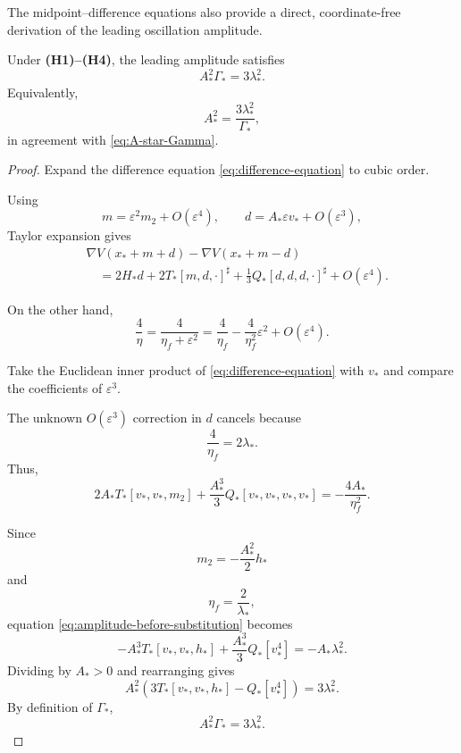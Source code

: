 The midpoint--difference equations also provide a direct,
coordinate-free derivation of the leading oscillation amplitude.

\begin{proposition}
\label{prop:amplitude-identity}
Under \textbf{(H1)--(H4)}, the leading amplitude satisfies
\begin{equation}
A_*^2\Gamma_*
=
3\lambda_*^2.
\label{eq:amplitude-Gamma-identity}
\end{equation}
Equivalently,
\begin{equation}
A_*^2
=
\frac{3\lambda_*^2}{\Gamma_*},
\label{eq:amplitude-coordinate-free}
\end{equation}
in agreement with
\eqref{eq:A-star-Gamma}.
\end{proposition}

\begin{proof}
Expand the difference equation
\eqref{eq:difference-equation} to cubic order.

Using
\[
m
=
\varepsilon^2m_2+O(\varepsilon^4),
\qquad
d
=
A_*\varepsilon v_*+O(\varepsilon^3),
\]
Taylor expansion gives
\begin{align}
&
\nabla V(x_*+m+d)
-
\nabla V(x_*+m-d)
\nonumber\\
&\quad=
2H_*d
+
2T_*[m,d,\cdot]^\sharp
+
\frac13Q_*[d,d,d,\cdot]^\sharp
+
O(\varepsilon^4).
\label{eq:difference-expanded}
\end{align}

On the other hand,
\[
\frac{4}{\eta}
=
\frac{4}{\eta_f+\varepsilon^2}
=
\frac{4}{\eta_f}
-
\frac{4}{\eta_f^2}\varepsilon^2
+
O(\varepsilon^4).
\label{eq:four-over-eta}
\]

Take the Euclidean inner product of
\eqref{eq:difference-equation} with $v_*$ and compare the
coefficients of $\varepsilon^3$.

The unknown $O(\varepsilon^3)$ correction in $d$ cancels because
\[
\frac{4}{\eta_f}
=
2\lambda_*.
\]
Thus,
\begin{equation}
2A_*
T_*[v_*,v_*,m_2]
+
\frac{A_*^3}{3}
Q_*[v_*,v_*,v_*,v_*]
=
-\frac{4A_*}{\eta_f^2}.
\label{eq:amplitude-before-substitution}
\end{equation}

Since
\[
m_2
=
-\frac{A_*^2}{2}h_*
\]
and
\[
\eta_f=\frac{2}{\lambda_*},
\]
equation \eqref{eq:amplitude-before-substitution} becomes
\[
-A_*^3T_*[v_*,v_*,h_*]
+
\frac{A_*^3}{3}Q_*[v_*^4]
=
-A_*\lambda_*^2.
\]
Dividing by $A_*>0$ and rearranging gives
\[
A_*^2
\left(
3T_*[v_*,v_*,h_*]
-
Q_*[v_*^4]
\right)
=
3\lambda_*^2.
\]
By definition of $\Gamma_*$,
\[
A_*^2\Gamma_*
=
3\lambda_*^2.
\]
\end{proof}

